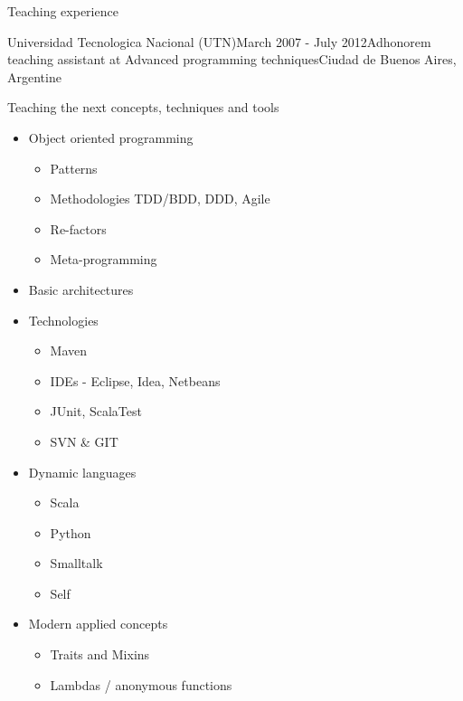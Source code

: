 \documentclass{resume} %
\begin{document}

\begin{rSection}{Teaching experience}


\begin{rSubsection}{Universidad Tecnologica Nacional (UTN)}{March 2007 - July 2012}{Adhonorem teaching assistant at Advanced programming techniques}{Ciudad de Buenos Aires, Argentine}
\item Teaching the next concepts, techniques and tools
\begin{itemize}
	\item Object oriented programming
	\begin{itemize}
		\item Patterns
		\item Methodologies TDD/BDD, DDD, Agile
		\item Re-factors
		\item Meta-programming
	\end{itemize}
	\item Basic architectures
	\item Technologies
	\begin{itemize}
		\item Maven 
		\item IDEs - Eclipse, Idea, Netbeans
		\item JUnit, ScalaTest
		\item SVN \& GIT
	\end{itemize}
	\item Dynamic languages 
	\begin{itemize}
		\item  Scala
		\item  Python
		\item  Smalltalk
		\item  Self
	\end{itemize}
	\item Modern applied concepts
	\begin{itemize}
		\item Traits and Mixins
		\item  Lambdas / anonymous functions
	\end{itemize}
\end{itemize}
\end{rSubsection}


\end{rSection}
\end{document}
